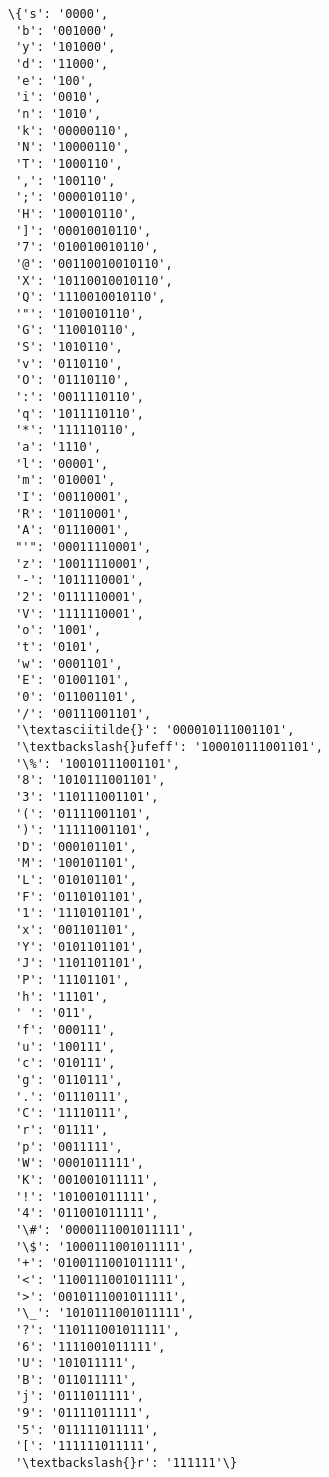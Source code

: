 \documentclass[11pt]{article}
\makeatletter
\newcommand{\boxspacing}{\kern\kvtcb@left@rule\kern\kvtcb@boxsep}
\newcommand{\prompt}[4]{
        \ttfamily\llap{{\color{#2}[#3]:\hspace{3pt}#4}}\vspace{-\baselineskip}
    }
\makeatother
\begin{document}
            \begin{tcolorbox}[breakable, size=fbox, boxrule=.5pt, pad at break*=1mm, opacityfill=0]
\prompt{Out}{outcolor}{5}{\boxspacing}
\begin{Verbatim}[commandchars=\\\{\}]
\{'s': '0000',
 'b': '001000',
 'y': '101000',
 'd': '11000',
 'e': '100',
 'i': '0010',
 'n': '1010',
 'k': '00000110',
 'N': '10000110',
 'T': '1000110',
 ',': '100110',
 ';': '000010110',
 'H': '100010110',
 ']': '00010010110',
 '7': '010010010110',
 '@': '00110010010110',
 'X': '10110010010110',
 'Q': '1110010010110',
 '"': '1010010110',
 'G': '110010110',
 'S': '1010110',
 'v': '0110110',
 'O': '01110110',
 ':': '0011110110',
 'q': '1011110110',
 '*': '111110110',
 'a': '1110',
 'l': '00001',
 'm': '010001',
 'I': '00110001',
 'R': '10110001',
 'A': '01110001',
 "'": '00011110001',
 'z': '10011110001',
 '-': '1011110001',
 '2': '0111110001',
 'V': '1111110001',
 'o': '1001',
 't': '0101',
 'w': '0001101',
 'E': '01001101',
 '0': '011001101',
 '/': '00111001101',
 '\textasciitilde{}': '000010111001101',
 '\textbackslash{}ufeff': '100010111001101',
 '\%': '10010111001101',
 '8': '1010111001101',
 '3': '110111001101',
 '(': '01111001101',
 ')': '11111001101',
 'D': '000101101',
 'M': '100101101',
 'L': '010101101',
 'F': '0110101101',
 '1': '1110101101',
 'x': '001101101',
 'Y': '0101101101',
 'J': '1101101101',
 'P': '11101101',
 'h': '11101',
 ' ': '011',
 'f': '000111',
 'u': '100111',
 'c': '010111',
 'g': '0110111',
 '.': '01110111',
 'C': '11110111',
 'r': '01111',
 'p': '0011111',
 'W': '0001011111',
 'K': '001001011111',
 '!': '101001011111',
 '4': '011001011111',
 '\#': '0000111001011111',
 '\$': '1000111001011111',
 '+': '0100111001011111',
 '<': '1100111001011111',
 '>': '0010111001011111',
 '\_': '1010111001011111',
 '?': '110111001011111',
 '6': '1111001011111',
 'U': '101011111',
 'B': '011011111',
 'j': '0111011111',
 '9': '01111011111',
 '5': '011111011111',
 '[': '111111011111',
 '\textbackslash{}r': '111111'\}
\end{Verbatim}
\end{tcolorbox}
        
\end{document}
